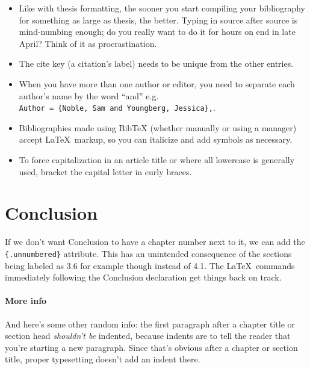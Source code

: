 \documentclass[12pt,twoside]{amherstthesis}
\providecommand{\tightlist}{%
  \setlength{\itemsep}{0pt}\setlength{\parskip}{0pt}}
\begin{document}
  \begin{itemize}
  \tightlist
  \item
    Like with thesis formatting, the sooner you start compiling your
    bibliography for something as large as thesis, the better. Typing in
    source after source is mind-numbing enough; do you really want to do
    it for hours on end in late April? Think of it as procrastination.
  \item
    The cite key (a citation's label) needs to be unique from the other
    entries.
  \item
    When you have more than one author or editor, you need to separate
    each author's name by the word ``and'' e.g.
    \texttt{Author\ =\ \{Noble,\ Sam\ and\ Youngberg,\ Jessica\},}.
  \item
    Bibliographies made using BibTeX (whether manually or using a manager)
    accept \LaTeX~markup, so you can italicize and add symbols as
    necessary.
  \item
    To force capitalization in an article title or where all lowercase is
    generally used, bracket the capital letter in curly braces.
  \end{itemize}
  
  \chapter*{Conclusion}\label{conclusion}
  
  \setcounter{chapter}{4} \setcounter{section}{0}
  
  If we don't want Conclusion to have a chapter number next to it, we can
  add the \texttt{\{.unnumbered\}} attribute. This has an unintended
  consequence of the sections being labeled as 3.6 for example though
  instead of 4.1. The \LaTeX~commands immediately following the Conclusion
  declaration get things back on track.
  
  \subsubsection{More info}\label{more-info}
  
  And here's some other random info: the first paragraph after a chapter
  title or section head \emph{shouldn't be} indented, because indents are
  to tell the reader that you're starting a new paragraph. Since that's
  obvious after a chapter or section title, proper typesetting doesn't add
  an indent there.
  
\end{document}

